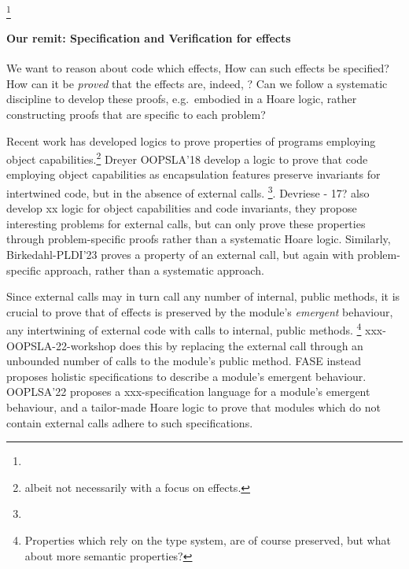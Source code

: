 \footnote{
 }
 
\paragraph{Our remit: Specification and Verification  for  \tamed effects}  
We want to reason about  code which \tames effects,  
How can such \tamed effects be specified? How can  it be \emph{proved} that %
the effects are, indeed, \tamed?
Can we follow a systematic discipline to develop these proofs,
e.g.\ embodied in  a Hoare logic, rather constructing proofs that are 
specific to each problem?
 
Recent work has developed logics to prove properties of programs employing object capabilities.\footnote{albeit not necessarily with a focus on \tamed effects.}
Dreyer OOPSLA'18 develop a logic to prove that   code employing object capabilities as encapsulation features preserve invariants for intertwined code, but in the absence of external calls. 
 \footnote{}.
Devriese - 17? also develop xx logic for object capabilities and code
invariants, they propose interesting problems for external calls,
but can only prove these properties through problem-specific proofs
rather than a systematic Hoare logic. Similarly, 
Birkedahl-PLDI'23  proves a property of an external call, but again with
problem-specific approach, rather than a systematic approach.


Since external calls may in turn call any number of internal, public methods, 
it is crucial  to prove that \taming of effects is preserved by the module's 
\emph{emergent} behaviour, \ie any intertwining of external code with calls to internal, public methods.
\footnote{Properties which rely on the type system, are of course preserved, but what about more semantic properties?}
xxx-OOPSLA-22-workshop does this by replacing the external call through an unbounded number of calls to the module's public method.
 FASE instead proposes holistic specifications to describe a module's emergent behaviour. 
 OOPLSA'22 proposes a xxx-specification language for a module's emergent behaviour, and a tailor-made Hoare logic to prove that modules which do not contain external calls adhere to such specifications.



